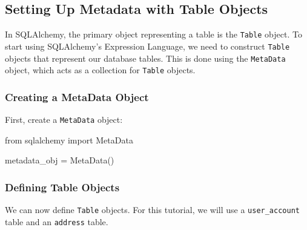 \documentclass[
  letterpaper,
  DIV=11,
  numbers=noendperiod]{scrreprt}
\newenvironment{Shaded}{\begin{snugshade}}{\end{snugshade}}
\newcommand{\ImportTok}[1]{\textcolor[rgb]{0.00,0.46,0.62}{#1}}
\newcommand{\NormalTok}[1]{\textcolor[rgb]{0.00,0.23,0.31}{#1}}
\newcommand{\OperatorTok}[1]{\textcolor[rgb]{0.37,0.37,0.37}{#1}}
\begin{document}
\subsection{Setting Up Metadata with Table
Objects}\label{setting-up-metadata-with-table-objects}

In SQLAlchemy, the primary object representing a table is the
\texttt{Table} object. To start using SQLAlchemy's Expression Language,
we need to construct \texttt{Table} objects that represent our database
tables. This is done using the \texttt{MetaData} object, which acts as a
collection for \texttt{Table} objects.

\subsubsection{Creating a MetaData
Object}\label{creating-a-metadata-object}

First, create a \texttt{MetaData} object:

\begin{Shaded}
\begin{Highlighting}[]
\ImportTok{from}\NormalTok{ sqlalchemy }\ImportTok{import}\NormalTok{ MetaData}

\NormalTok{metadata\_obj }\OperatorTok{=}\NormalTok{ MetaData()}
\end{Highlighting}
\end{Shaded}

\subsubsection{Defining Table Objects}\label{defining-table-objects}

We can now define \texttt{Table} objects. For this tutorial, we will use
a \texttt{user\_account} table and an \texttt{address} table.
\end{document}
